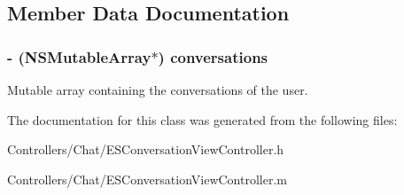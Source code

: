 \subsection{Member Data Documentation}
\hypertarget{interface_e_s_conversation_view_controller_a208ee9f8929670fa40410428ef7d0382}{}
\subsubsection[{conversations}]{\setlength{\rightskip}{0pt plus 5cm}-\/ (N\+S\+Mutable\+Array$\ast$) conversations\hspace{0.3cm}{\ttfamily [protected]}}\label{interface_e_s_conversation_view_controller_a208ee9f8929670fa40410428ef7d0382}
Mutable array containing the conversations of the user. 

The documentation for this class was generated from the following files\+:\begin{DoxyCompactItemize}
\item 
Controllers/\+Chat/E\+S\+Conversation\+View\+Controller.\+h\item 
Controllers/\+Chat/E\+S\+Conversation\+View\+Controller.\+m\end{DoxyCompactItemize}
